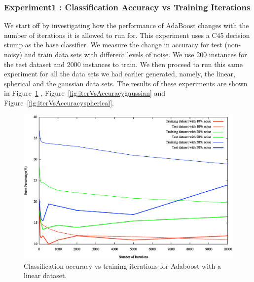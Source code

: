 \documentclass[letterpaper,11pt]{article}
\begin{document}
\subsubsection{Experiment1 : Classification Accuracy vs Training Iterations}  We start off by investigating how the performance of AdaBoost changes with the number of iterations it is allowed to run for. This experiment uses a C45 decision stump as the base classifier. We measure the change in accuracy for test (non-noisy) and train data sets with different levels of noise. We use 200 instances for the test dataset and 2000 instances to train. We then proceed to run this same experiment for all the data sets we had earlier generated, namely, the linear, spherical and the gaussian data sets. The results of these experiments are shown in Figure~\ref{fig:iterVsAccuracylinear} , Figure~\ref{fig:iterVsAccuracygaussian} and Figure~\ref{fig:iterVsAccuracyspherical}.
\begin{figure}[H]
  \centering
  \includegraphics[width=140mm]{iterVsAccuracy-linear.eps}
  \caption{Classification accuracy vs training iterations for Adaboost with a linear dataset.}
  \label{fig:iterVsAccuracylinear}
\end{figure}
\end{document}
